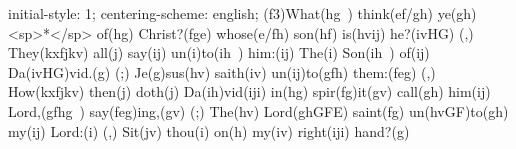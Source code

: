 initial-style: 1;
centering-scheme: english;
(f3)What(hg~) think(ef/gh) ye(gh) <sp>*</sp> of(hg) Christ?(fge) whose(e/fh) son(hf) is(hvij) he?(ivHG) (,) They(kxfjkv) all(j) say(ij) un(i)to(ih~) him:(ij) The(i) Son(ih~) of(ij) Da(ivHG)vid.(g) (;) Je(g)sus(hv) saith(iv) un(ij)to(gfh) them:(feg) (,) How(kxfjkv) then(j) doth(j) Da(ih)vid(iji) in(hg) spir(fg)it(gv) call(gh) him(ij) Lord,(gfhg~) say(feg)ing,(gv) (;) The(hv) Lord(ghGFE) saint(fg) un(hvGF)to(gh) my(ij) Lord:(i) (,) Sit(jv) thou(i) on(h) my(iv) right(iji) hand?(g)
